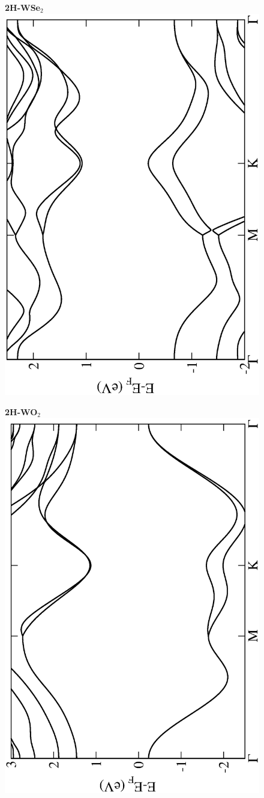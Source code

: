 \begin{figure}[htbp]
\centering
{\bfseries \sffamily 2H-WSe$_{2}$}\\
\includegraphics[width=0.45\linewidth, angle=-90, trim={2.9cm, 0cm, 2cm, 0cm}, clip]{img/SI_figs/BS/2H-WSe2.eps}
\end{figure}

\begin{figure}[htbp]
\centering
{\bfseries \sffamily 2H-WO$_{2}$}\\
\includegraphics[width=0.45\linewidth, angle=-90, trim={2.9cm, 0cm, 2cm, 0cm}, clip]{img/SI_figs/BS/2H-WO2.eps}
\end{figure}

